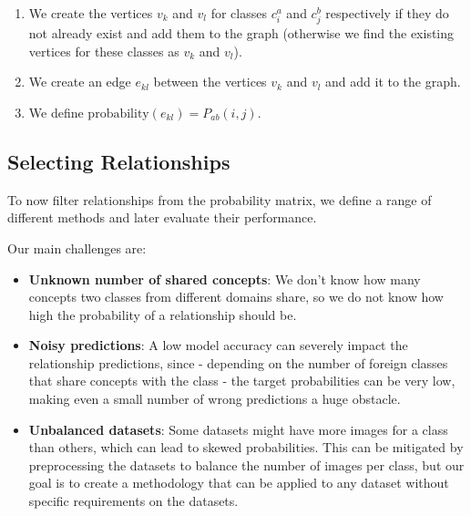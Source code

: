 \begin{enumerate}
\begin{enumerate}
\begin{enumerate}
                              \item We create the vertices $v_k$ and $v_l$ for classes $c_i^a$ and $c_j^b$ respectively
                                    if they do not already exist and add them to the graph
                                    (otherwise we find the existing vertices for these classes as $v_k$ and $v_l$).
                              \item We create an edge $e_{kl}$ between the vertices $v_k$ and $v_l$ and add it to the graph.
                              \item We define $\text{probability}(e_{kl}) = P_{ab}(i, j)$.
                        \end{enumerate}
            \end{enumerate}
\end{enumerate}

\subsection{Selecting Relationships}

To now filter relationships from the probability matrix,
we define a range of different methods and later evaluate their performance.

Our main challenges are:

\begin{itemize}
      \item \textbf{Unknown number of shared concepts}: We don't know how many concepts two classes from different
            domains share, so we do not know how high the probability of a relationship should be.
      \item \textbf{Noisy predictions}: A low model accuracy can severely impact the relationship
            predictions, since - depending on the number of foreign classes that share concepts with the class -
            the target probabilities can be very low, making even a small number of wrong predictions
            a huge obstacle.
      \item \textbf{Unbalanced datasets}: Some datasets might have more images for a class than others,
            which can lead to skewed probabilities.
            This can be mitigated by preprocessing the datasets to balance the number of images per class,
            but our goal is to create a methodology that can be applied to any dataset without
            specific requirements on the datasets.
\end{itemize}

